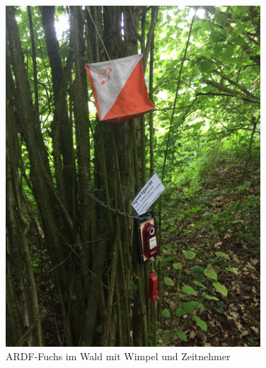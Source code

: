 \begin{frame}
\begin{columns}
\begin{column}{0.48\textwidth}
\begin{figure}
    \includegraphics[width=0.85\textwidth]{foto/190}
    \caption{\scriptsize ARDF-Fuchs im Wald mit Wimpel und Zeitnehmer}
    \label{n_ardf_fuchs}
\end{figure}

   \end{column}
\end{columns}

\end{frame}

